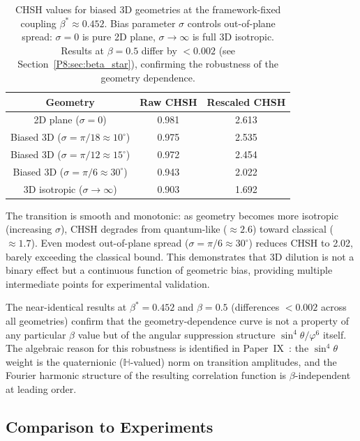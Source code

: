 \documentclass[11pt,a4paper]{article}
\theoremstyle{definition}
\theoremstyle{remark}
\newcommand{\vp}{\varphi}
\begin{document}
\begin{table}[h]
\centering
\caption{CHSH values for biased 3D geometries at the framework-fixed coupling
$\beta^*\approx0.452$. Bias parameter $\sigma$ controls out-of-plane spread:
$\sigma=0$ is pure 2D plane, $\sigma \to \infty$ is full 3D isotropic.
Results at $\beta=0.5$ differ by $<0.002$ (see Section~\ref{P8:sec:beta_star}),
confirming the robustness of the geometry dependence.}
\label{P8:tab:biased3d_chsh}
\begin{tabular}{c|c|c}
\hline
Geometry & Raw CHSH & Rescaled CHSH \\
\hline
2D plane ($\sigma = 0$) & 0.981 & 2.613 \\
Biased 3D ($\sigma = \pi/18 \approx 10^\circ$) & 0.975 & 2.535 \\
Biased 3D ($\sigma = \pi/12 \approx 15^\circ$) & 0.972 & 2.454 \\
Biased 3D ($\sigma = \pi/6 \approx 30^\circ$) & 0.943 & 2.022 \\
3D isotropic ($\sigma \to \infty$) & 0.903 & 1.692 \\
\hline
\end{tabular}
\end{table}

The transition is smooth and monotonic: as geometry becomes more isotropic (increasing $\sigma$), CHSH degrades from quantum-like ($\approx 2.6$) toward classical ($\approx 1.7$). Even modest out-of-plane spread ($\sigma = \pi/6 \approx 30^\circ$) reduces CHSH to 2.02, barely exceeding the classical bound. This demonstrates that 3D dilution is not a binary effect but a continuous function of geometric bias, providing multiple intermediate points for experimental validation.

The near-identical results at $\beta^* = 0.452$ and $\beta = 0.5$ (differences $< 0.002$ across all geometries) confirm that the geometry-dependence curve is not a property of any particular $\beta$ value but of the angular suppression structure $\sin^4\theta/\vp^6$ itself. The algebraic reason for this robustness is identified in Paper~IX~\cite{Paper9}: the $\sin^4\theta$ weight is the quaternionic ($\mathbb{H}$-valued) norm on transition amplitudes, and the Fourier harmonic structure of the resulting correlation function is $\beta$-independent at leading order.

\subsection{Comparison to Experiments}
\end{document}
